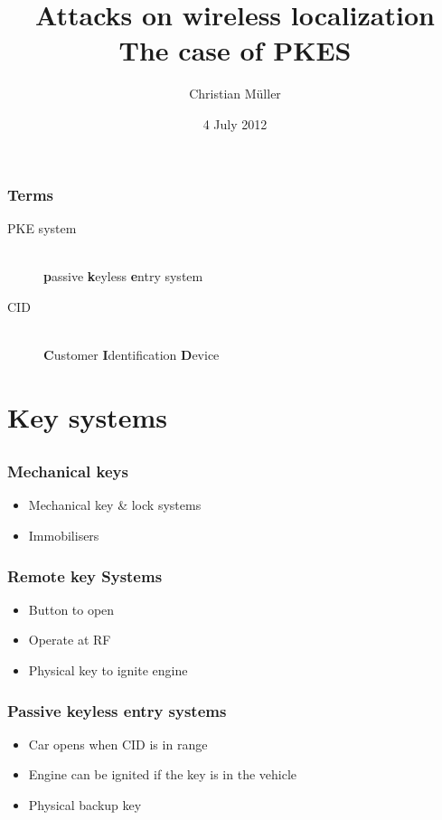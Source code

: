 \documentclass[12pt]{beamer}
\title{Attacks on wireless localization\\ The case of PKES}
\author{Christian Müller}
\date{4 July 2012}
\begin{document}
	\begin{frame}
		\titlepage
	\end{frame}

	\begin{frame}
		\frametitle{Terms}
			\begin{description}
				\item[PKE system]\hfill \\
						\textbf{p}assive \textbf{k}eyless \textbf{e}ntry system
				\item[CID] \hfill \\
					\textbf{C}ustomer \textbf{I}dentification \textbf{D}evice
			\end{description}
	\end{frame}

	\begin{frame}
		\tableofcontents
	\end{frame}
	
\section{Key systems}
\subsection*{}
	\begin{frame}
		\frametitle{Mechanical keys}
		\begin{itemize}
			\item Mechanical key \& lock systems
			\item Immobilisers
		\end{itemize}
	\end{frame}
	
	\begin{frame}
		\frametitle{Remote key Systems}
		\begin{itemize}
			\item Button to open
			\item Operate at RF 	%
			\item Physical key to ignite engine
		\end{itemize}
	\end{frame}

	\begin{frame}
		\frametitle{Passive keyless entry systems}
		\begin{itemize}
			\item Car opens when CID is in range
			\item Engine can be ignited if the key is in the vehicle
			\item Physical backup key
		\end{itemize}
	\end{frame}
\end{document}
